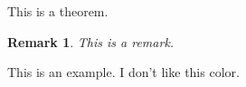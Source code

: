 \documentclass[xcolor=dvipsnames]{beamer}
\newtheorem*{Remark}{Remark}
\begin{document}
\begin{frame}
\begin{Theorem}
This is a theorem.
\end{Theorem}
\begin{Remark}
This is a remark.
\end{Remark}
\begin{Example}
This is an example. I don't like this color.
\end{Example}
\end{frame}
\end{document}
